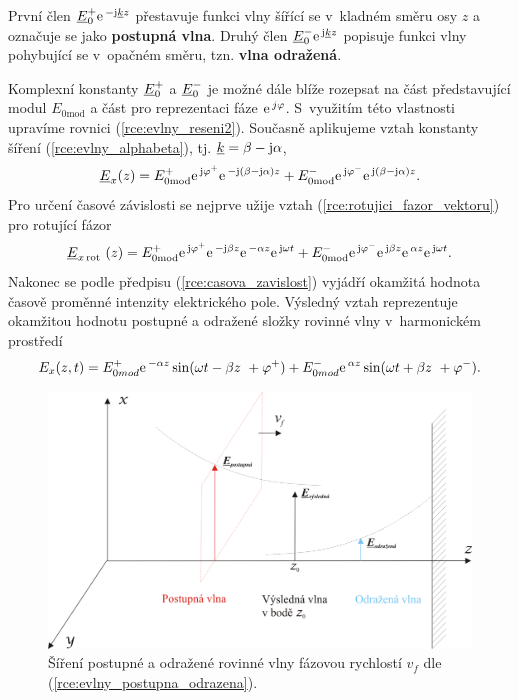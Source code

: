 První člen $ {\underline{E}}_{0}^{+}\mathrm{e\,}^{-\mathrm{j}{\underline{k}} z}$ přestavuje funkci vlny šířící se v~kladném směru osy $z$ a označuje se jako {\bf postupná vlna}. Druhý člen ${\underline{E}}_{0}^{-}\mathrm{e\,}^{\mathrm{j}{\underline{k}} z}$ popisuje funkci vlny pohybující se v~opačném směru, tzn. {\bf vlna odražená}.

Komplexní konstanty ${\underline{E}}_{0}^{+}$ a ${\underline{E}}_{0}^{-}$ je možné dále blíže rozepsat na část představující modul $E_{0\mathrm{mod}}$ a část pro reprezentaci fáze $\mathrm{e\,}^{j\varphi}$. S~využitím této vlastnosti upravíme rovnici (\ref{rce:evlny_reseni2}). Současně aplikujeme vztah konstanty šíření (\ref{rce:evlny_alphabeta}), tj. ${\underline{k}} = \beta - \mathrm{j}\alpha$,
\begin{displaymath}
	{\underline{E}}_{x}(z) = E_{0\mathrm{mod}}^{+}\mathrm{e\,}^{\mathrm{j}\varphi^{+}}\mathrm{e\,}^{-\mathrm{j}(\beta - \mathrm{j}\alpha)z} + E_{0\mathrm{mod}}^{-}\mathrm{e\,}^{\mathrm{j}\varphi^{-}}\mathrm{e\,}^{\mathrm{j}(\beta-\mathrm{j}\alpha)z}.
\end{displaymath}
Pro určení časové závislosti se nejprve užije vztah (\ref{rce:rotujici_fazor_vektoru}) pro rotující fázor
\begin{displaymath}
	{\underline{E}}_{x\,\mathrm{rot}\ }(z) = E_{0\mathrm{mod}}^{+}\mathrm{e\,}^{\mathrm{j}\varphi^{+}}\mathrm{e\,}^{-\mathrm{j}\beta z}\mathrm{e\,}^{-\alpha z}\mathrm{e\,}^{\mathrm{j}\omega t} + E_{0\mathrm{mod}}^{-}\mathrm{e\,}^{\mathrm{j}\varphi^{-}}\mathrm{e\,}^{\mathrm{j}\beta z}\mathrm{e\,}^{\alpha z}\mathrm{e\,}^{\mathrm{j}\omega t}.
\end{displaymath}
Nakonec se podle předpisu (\ref{rce:casova_zavislost}) vyjádří okamžitá hodnota časově proměnné intenzity elektrického pole. Výsledný vztah reprezentuje okamžitou hodnotu postupné a odražené složky rovinné vlny v~harmonickém prostředí
\begin{equation}
	E_{x}(z,t) = E_{0mod}^{+}\mathrm{e\,}^{-\alpha z}\sin(\omega t - \beta z~+ \varphi^{+}) + E_{0mod}^{-}\mathrm{e\,}^{\alpha z}\sin(\omega t + \beta z~+ \varphi^{-}).
	\label{rce:evlny_postupna_odrazena}
\end{equation}

\begin{figure}[!h]
	\centering
	\includegraphics[width=14cm]{evlny_postupna_odrazena.png}
	\caption{Šíření postupné a odražené rovinné vlny fázovou rychlostí $v_f$ dle (\ref{rce:evlny_postupna_odrazena}).}
	\label{obr:evlny_postupna_odrazena}
\end{figure}
